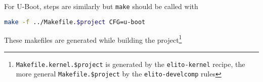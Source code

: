 For U-Boot, steps are similarly but \texttt{make} should be called with
\begin{lstlisting}[language=sh]
make -f ../Makefile.$project CFG=u-boot
\end{lstlisting}

These makefiles are generated while building the project\footnote{\texttt{Makefile.kernel.\$project} is generated by the \texttt{elito-kernel} recipe, the more general \texttt{Makefile.\$project} by the \texttt{elito-develcomp} rules}

